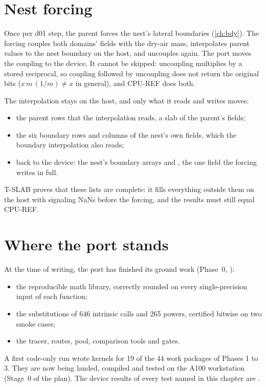\section{Nest forcing}

Once per d01 step, the parent forces the nest's lateral boundaries (\cref{ch:bdy}). The forcing couples both domains'
fields with the dry-air mass, interpolates parent values to the nest boundary on the host, and uncouples again. The
port moves the coupling to the device. It cannot be skipped: uncoupling multiplies by a stored reciprocal, so
coupling followed by uncoupling does not return the original bits ($x\,m\,(1/m) \ne x$ in general), and CPU-REF does
both.

The interpolation stays on the host, and only what it reads and writes moves:
\begin{itemize}
  \item the parent rows that the interpolation reads, a slab of the parent's fields;
  \item the six boundary rows and columns of the nest's own fields, which the boundary interpolation also reads;
  \item back to the device: the nest's boundary arrays and , the one field the forcing writes in full.
\end{itemize}
T-SLAB proves that these lists are complete: it fills everything outside them on the host with signaling NaNs before
the forcing, and the results must still equal CPU-REF.

\section{Where the port stands}

At the time of writing, the port has finished its ground work (Phase~0, ):
\begin{itemize}
  \item the reproducible math library, correctly rounded on every single-precision input of each function;
  \item the substitutions of 646 intrinsic calls and 265 powers, certified bitwise on two smoke cases;
  \item the tracer, routes, pool, comparison tools and gates.
\end{itemize}
A first code-only run wrote kernels for 19 of the 44 work packages of Phases 1 to 3. They are now being landed,
compiled and tested on the A100 workstation (Stage~0 of the plan). The device results of every test named in this
chapter are \tbr.
